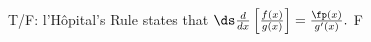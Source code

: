 {T/F: l'H\^opital's Rule states that $\ds \frac{d}{dx}\left[\frac{f(x)}{g(x)}\right] = \frac{\fp(x)}{g'(x)}.$}
{F}
